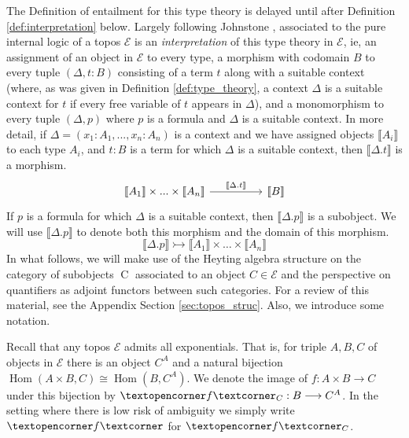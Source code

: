 \documentclass{tac}
\newcommand{\call}[1]{\mathcal{#1}}
\newcommand{\adj}[1]{\text{\textopencorner}{#1}\text{\textcorner}}
\newcommand{\lto}{\longrightarrow}
\begin{document}
	The Definition of entailment for this type theory is delayed until after Definition \ref{def:interpretation} below.
	Largely following Johnstone \cite[\S D4.1]{Johnstone}, associated to the pure internal logic of a topos $\call{E}$ is an \emph{interpretation} of this type theory in $\call{E}$, ie, an assignment of an object in $\call{E}$ to every type, a morphism with codomain $B$ to every tuple $(\Delta,t:B)$ consisting of a term $t$ along with a suitable context (where, as was given in Definition \ref{def:type_theory}, a context $\Delta$  is a suitable context for $t$ if every free variable of $t$ appears in $\Delta$), and a monomorphism to every tuple $(\Delta, p)$ where $p$ is a formula and $\Delta$ is a suitable context. In more detail, if $\Delta = (x_1:A_1,...,x_n:A_n)$ is a context and we have assigned objects $\llbracket A_i\rrbracket$ to each type $A_i$, and $t:B$ is a term for which $\Delta$ is a suitable context, then $\llbracket \Delta . t \rrbracket$ is a morphism.
	\[
	\begin{tikzcd}[column sep = huge]
		\llbracket A_1 \rrbracket \times ... \times \llbracket A_n \rrbracket\arrow[r,"{\llbracket \Delta . t\rrbracket}"] & \llbracket B \rrbracket
	\end{tikzcd}
	\]
	If $p$ is a formula for which $\Delta$ is a suitable context, then $\llbracket \Delta . p \rrbracket$ is a subobject. We will use $\llbracket \Delta. p \rrbracket$ to denote both this morphism and the domain of this morphism.
	\begin{equation}
		\llbracket \Delta. p \rrbracket \rightarrowtail \llbracket A_1 \rrbracket \times \hdots \times \llbracket A_n \rrbracket
	\end{equation}
	In what follows, we will make use of the Heyting algebra structure on the category of subobjects $\operatorname{C}$ associated to an object $C \in \call{E}$ and the perspective on quantifiers as adjoint functors between such categories. For a review of this material, see the Appendix Section \ref{sec:topos_struc}. Also, we introduce some notation.
	\begin{notation}\label{not:adj}
		Recall that any topos $\call{E}$ admits all exponentials. That is, for triple $A,B,C$ of objects in $\call{E}$ there is an object $C^A$ and a natural bijection $\operatorname{Hom}(A \times B, C) \cong \operatorname{Hom}(B,C^A)$. We denote the image of $f:A \times B \lto C$ under this bijection by $\adj{f}_C: B \lto C^A$. In the setting where there is low risk of ambiguity we simply write $\adj{f}$ for $\adj{f}_C$.
	\end{notation}
\end{document}
